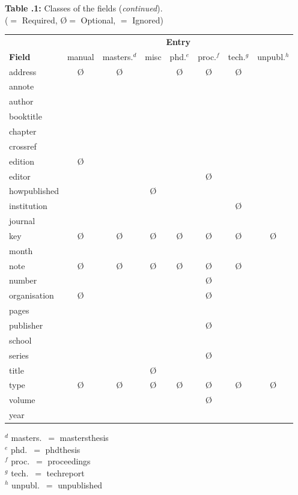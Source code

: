 \newpage

\null\vfil
\noindent\begin{center}
{\bf Table \thesection.1:} Classes of the fields ({\it continued\/}). \\
(\R $=$ Required, \O $=$ Optional, \I $=$ Ignored) \medskip \\
%
\begin{tabular}{lccccccc} \hline
 & \multicolumn{7}{c}{\bf Entry} \\
{\bf Field} & manual & masters.$^d$ & misc & phd.$^e$ & proc.$^f$ & tech.$^g$
 & unpubl.$^h$ \\ \hline\hline
address      & \O & \O & \I & \O & \O & \O & \I \\
annote       & \I & \I & \I & \I & \I & \I & \I \\
author       & \R & \R & \R & \R & \R & \R & \R \\
booktitle    & \I & \I & \I & \I & \I & \I & \I \\
chapter      & \I & \I & \I & \I & \I & \I & \I \\
crossref     & \I & \I & \I & \I & \I & \I & \I \\
edition      & \O & \I & \I & \I & \I & \I & \I \\
editor       & \I & \I & \I & \I & \O & \I & \I \\
howpublished & \I & \I & \O & \I & \I & \I & \I \\
institution  & \I & \I & \I & \I & \I & \O & \I \\
journal      & \I & \I & \I & \I & \I & \I & \I \\
key          & \O & \O & \O & \O & \O & \O & \O \\
month        & \I & \I & \I & \I & \I & \I & \I \\
note         & \O & \O & \O & \O & \O & \O & \R \\
number       & \I & \I & \I & \I & \O & \I & \I \\
organisation & \O & \I & \I & \I & \O & \I & \I \\
pages        & \I & \I & \I & \I & \I & \I & \I \\
publisher    & \I & \I & \I & \I & \O & \I & \I \\
school       & \I & \R & \I & \R & \I & \I & \I \\
series       & \I & \I & \I & \I & \O & \I & \I \\
title        & \R & \I & \O & \I & \R & \R & \R \\
type         & \O & \O & \O & \O & \O & \O & \O \\
volume       & \I & \I & \I & \I & \O & \I & \I \\
year         & \R & \R & \R & \R & \R & \R & \R \\ \hline
\end{tabular}
\end{center}
$^d$ masters.\ $=$ mastersthesis \\
$^e$ phd.\ $=$ phdthesis \\
$^f$ proc.\ $=$ proceedings \\
$^g$ tech.\ $=$ techreport \\
$^h$ unpubl.\ $=$ unpublished

